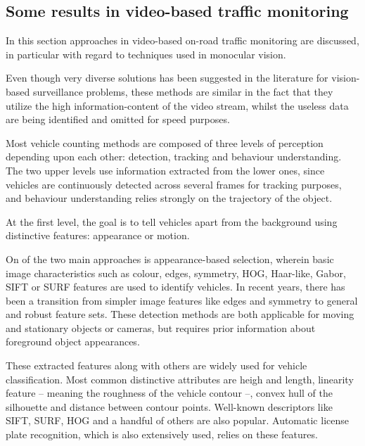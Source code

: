 \subsection{Some results in video-based traffic monitoring}
In this section approaches in video-based on-road traffic monitoring are discussed, in particular with regard to techniques used in monocular vision.

Even though very diverse solutions has been suggested in the literature for vision-based surveillance problems, these methods are similar in the fact that they utilize the high information-content of the video stream, whilst the useless data are being identified and omitted for speed purposes.

Most vehicle counting methods are composed of three levels of perception depending upon each other: detection, tracking and behaviour understanding.
The two upper levels use information extracted from the lower ones, since vehicles are continuously detected across several frames for tracking purposes, and behaviour understanding relies strongly on the trajectory of the object.

At the first level, the goal is to tell vehicles apart from the background using distinctive features: appearance or motion.

On of the two main approaches is appearance-based selection, wherein basic image characteristics such as colour\cite{Chang2005}, edges\cite{Blanc2007}, symmetry\cite{Aytekin2010}, HOG\cite{TehraniNiknejad2012}, Haar-like\cite{Sivaraman2012}, Gabor\cite{Zhang2006}, SIFT\cite{Zhang2011} or SURF\cite{Lin2012} features are used to identify vehicles.
In recent years, there has been a transition from simpler image features like edges and symmetry to general and robust feature sets\cite{Sivaraman2012}.
These detection methods are both applicable for moving and stationary objects or cameras, but requires prior information about foreground object appearances.

These extracted features along with others are widely used for vehicle classification.
Most common distinctive attributes are heigh and length\cite{Huang2004}, linearity feature -- meaning the roughness of the vehicle contour\cite{Zhang2008} --, convex hull of the silhouette\cite{Buch2010} and distance between contour points\cite{Lou2005}.
Well-known descriptors like SIFT\cite{Zhang2011}, SURF\cite{Lin2012}, HOG\cite{Niknejad2012a} and a handful of others are also popular.
Automatic license plate recognition, which is also extensively used, relies on these features\cite{Luvizon2016}. 


